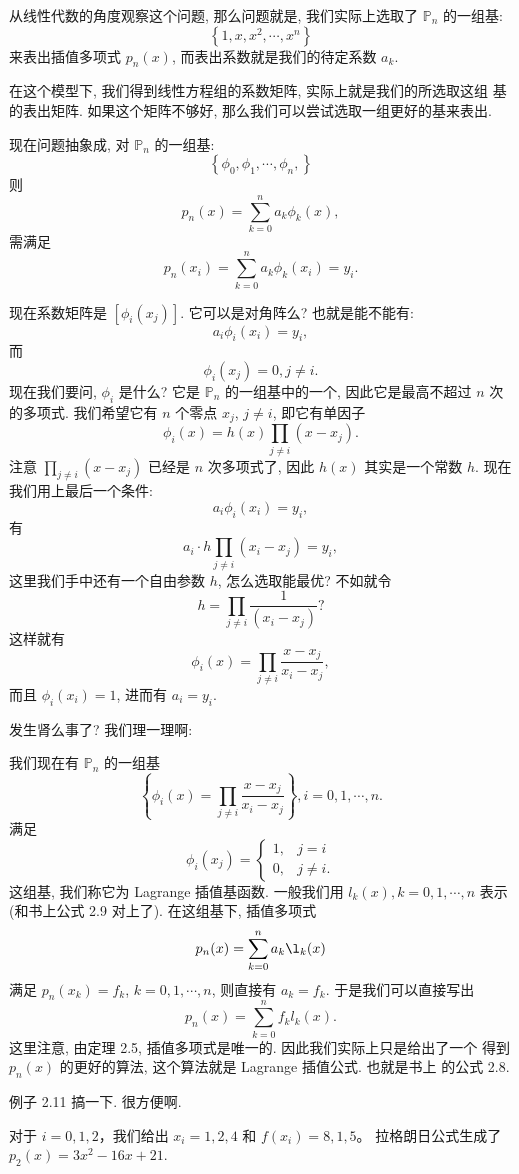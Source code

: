 \documentclass[a4paper]{ctexart}
\begin{document}
从线性代数的角度观察这个问题, 那么问题就是, 我们实际上选取了
$\mathbb{P}_n$ 的一组基:
$$
\left\{1, x, x^2, \cdots, x^n\right\}
$$
来表出插值多项式 $p_n(x)$, 而表出系数就是我们的待定系数 $a_k$.

在这个模型下, 我们得到线性方程组的系数矩阵, 实际上就是我们的所选取这组
基的表出矩阵. 如果这个矩阵不够好, 那么我们可以尝试选取一组更好的基来表出.

现在问题抽象成, 对 $\mathbb{P}_n$ 的一组基:
$$
\left\{
\phi_0, \phi_1, \cdots, \phi_n,
\right\}
$$
则
$$
p_n(x) = \sum_{k = 0}^n a_k \phi_k(x),
$$
需满足
$$
p_n(x_i) = \sum_{k = 0}^n a_k \phi_k(x_i) = y_i.
$$

现在系数矩阵是 $\left[\phi_i(x_j)\right]$. 它可以是对角阵么? 也就是能不能有:
$$
a_i\phi_i(x_i) = y_i,
$$
而
$$
\phi_i(x_j) = 0, j \neq i.
$$
现在我们要问, $\phi_i$ 是什么? 它是 $\mathbb{P}_n$ 的一组基中的一个,
因此它是最高不超过 $n$ 次的多项式. 我们希望它有 $n$ 个零点 $x_j$, $j \neq i$,
即它有单因子
$$
\phi_i(x) = h(x) \prod_{j \neq i}(x - x_j).
$$
注意 $\prod_{j \neq i}(x - x_j)$ 已经是 $n$ 次多项式了, 因此 $h(x)$
其实是一个常数 $h$. 现在我们用上最后一个条件:
$$
a_i\phi_i(x_i) = y_i,
$$
有
$$
a_i \cdot h \prod_{j \neq i}(x_i - x_j) = y_i,
$$
这里我们手中还有一个自由参数 $h$, 怎么选取能最优? 
不如就令
$$
h = \prod_{j \neq i}\frac{1}{(x_i - x_j)} ?
$$
这样就有
$$
\phi_i(x) = \prod_{j \neq i}\frac{x - x_j}{x_i - x_j}, 
$$
而且 $\phi_i(x_i) = 1$, 进而有 $a_i = y_i$.

发生肾么事了? 我们理一理啊:

我们现在有 $\mathbb{P}_n$ 的一组基
$$
\left\{\phi_i(x) = \prod_{j \neq i}\frac{x - x_j}{x_i - x_j}
\right\}, i = 0, 1, \cdots, n.
$$
满足
$$
\phi_i(x_j) = \left\{
\begin{array}{ll}
  1,& j = i \\
  0,& j \neq i.
\end{array}
\right.
$$
这组基, 我们称它为 Lagrange 插值基函数. 一般我们用 $l_k(x), k = 0, 1, \cdots, n$
表示(和书上公式 2.9 对上了). 在这组基下, 插值多项式
$$
p_n(x) = \sum_{k = 0}^n a_k \l_k(x)
$$
满足 $p_n(x_k) = f_k$, $k = 0, 1, \cdots, n$,
则直接有 $a_k = f_k$. 于是我们可以直接写出
$$
p_n(x) = \sum_{k = 0}^n f_k l_k(x).
$$
这里注意, 由定理 2.5, 插值多项式是唯一的. 因此我们实际上只是给出了一个
得到 $p_n(x)$ 的更好的算法, 这个算法就是 Lagrange 插值公式. 也就是书上
的公式 2.8.

例子 2.11 搞一下. 很方便啊. 

对于 $i = 0, 1, 2$，我们给出 $x_i = 1, 2, 4$ 和 $f (x_i ) = 8, 1, 5$。
拉格朗日公式生成了 $p_2 (x) = 3x^2 - 16x + 21$.
\end{document}
